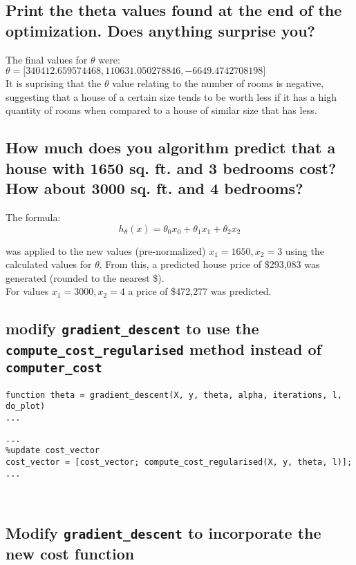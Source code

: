 \documentclass[titlepage]{scrartcl}
\newcommand{\code}[1]{\texttt{#1}}
\begin{document}
\subsection{Print the theta values found at the end of the optimization. Does anything surprise you?}
The final values for $\theta$ were:\\
$\theta = \big[ 340412.659574468, 110631.050278846, -6649.4742708198 \big]$\\
          
It is suprising that the $\theta$ value relating to the number of rooms is
negative, suggesting that a house of a certain size tends to be worth less if
it has a high quantity of rooms when compared to a house of similar size that
has less.

\subsection{How much does you algorithm predict that a house with 1650 sq. ft.
and 3 bedrooms cost? How about 3000 sq. ft. and 4 bedrooms?}

The formula:
$$h_\theta(x)=\theta_0x_0+\theta_1x_1+\theta_2x_2$$

was applied to the new values (pre-normalized) $x_1=1650, x_2=3$ using the calculated
values for $\theta$. From this, a predicted house price of \$293,083 was generated
(rounded to the nearest \$).\\
For values $x_1=3000, x_2=4$ a price of \$472,277 was predicted.

\subsection{modify \code{gradient\_descent} to use the
\code{compute\_cost\_regularised} method instead of \code{computer\_cost}}

\begin{lstlisting}
function theta = gradient_descent(X, y, theta, alpha, iterations, l, do_plot)
...
\end{lstlisting}

\begin{lstlisting}[firstnumber=40]
...
%update cost_vector
cost_vector = [cost_vector; compute_cost_regularised(X, y, theta, l)];
...
\end{lstlisting}\leavevmode \\

\subsection{Modify \code{gradient\_descent} to incorporate the new cost function}
\end{document}
